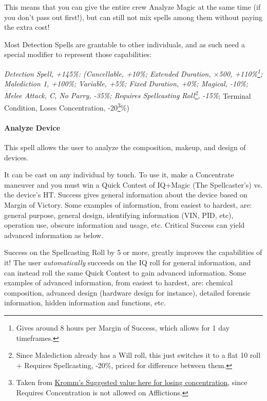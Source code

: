 \begin{multicols*}{3}
	This means that you can give the entire crew Analyze Magic at the same time (if you don't pass out first!), but can still not mix spells among them without paying the extra cost!
	
	Most Detection Spells are grantable to other individuals, and as such need a special modifier to represent those capabilities:
	
	\textcolor{OliveGreen}{\textit{Detection Spell, +145\%: (Cancellable, +10\%; Extended Duration, \(\times\)500, +110\%\footnote{Gives around 8 hours per Margin of Success, which allows for 1 day timeframes.}; Malediction 1, +100\%; Variable, +5\%; Fixed Duration, +0\%; Magical, -10\%; Melee Attack, C, No Parry, -35\%; Requires Spellcasting Roll\footnote{Since Malediction already has a Will roll, this just switches it to a flat 10 roll + Requires Spellcasting, -20\%, priced for difference between them.}, -15\%}; Terminal Condition, Loses Concentration, -20\footnote{Taken from \textcolor{Blue}{\href{http://forums.sjgames.com/showpost.php?p=817197&postcount=7}{Kromm's Suggested value here for losing concentration}}, since Requires Concentration is not allowed on Afflictions.}\%)}
	
	\paragraph{Analyze Device}
	
	This spell allows the user to analyze the composition, makeup, and design of devices. 
	
	It can be cast on any individual by touch. To use it, make a Concentrate maneuver and you must win a Quick Contest of IQ+Magic (The Spellcaster's) vs. the device's HT. Success gives general information about the device based on Margin of Victory. Some examples of information, from easiest to hardest, are: general purpose, general design, identifying information (VIN, PID, etc), operation use, obscure information and usage, etc. Critical Success can yield advanced information as below.
	
	Success on the Spellcasting Roll by 5 or more, greatly improves the capabilities of it! The user \textit{automatically} succeeds on the IQ roll for general information, and can instead roll the same Quick Contest to gain advanced information. Some examples of advanced information, from easiest to hardest, are: chemical composition, advanced design (hardware design for instance), detailed forensic information, hidden information and functions, etc.
	

\end{multicols*}
